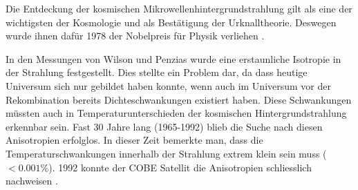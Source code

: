 Die Entdeckung der kosmischen Mikrowellenhintergrundstrahlung gilt als eine der 
wichtigsten der Kosmologie und als 
Bestätigung der Urknalltheorie.
Deswegen wurde ihnen dafür 1978 der Nobelpreis für Physik verliehen 
\cite{cmb:dicke}.

In den Messungen von Wilson und Penzias wurde eine erstaunliche Isotropie in 
der Strahlung festgestellt.
Dies stellte ein Problem dar, da dass heutige Universum sich nur gebildet haben 
konnte, wenn auch im Universum vor der Rekombination bereits Dichteschwankungen 
existiert haben.
Diese Schwankungen müssten auch in Temperaturunterschieden der kosmischen 
Hintergrundstrahlung erkennbar sein.
Fast 30 Jahre lang (1965-1992) blieb die Suche nach diesen Anisotropien 
erfolglos.
In dieser Zeit bemerkte man, dass die Temperaturschwankungen innerhalb der 
Strahlung extrem klein sein muss ($< 0.001\%$).
1992 konnte der \ac{COBE} Satellit die Anisotropien schliesslich nachweisen
\cite{cmb:m_schoenitzer}.


